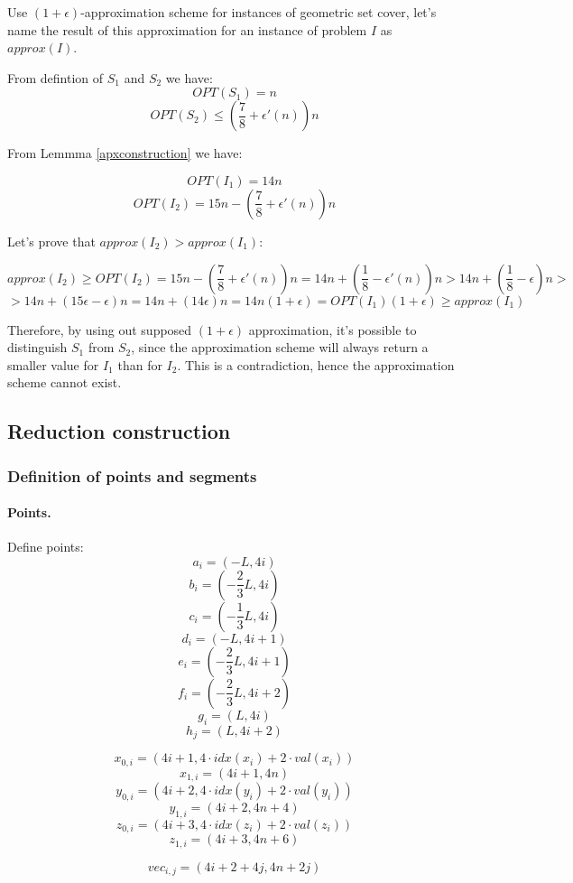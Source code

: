 Use $(1+\epsilon)$-approximation scheme for instances of geometric
set cover, let's name the result of this approximation
for an instance of problem $I$ as $approx(I)$.

From defintion of $S_1$ and $S_2$ we have:
$$OPT(S_1) = n$$
$$OPT(S_2) \le (\frac{7}{8} + \epsilon'(n))n$$

From Lemmma \ref{apxconstruction} we have:

$$OPT(I_1) = 14n$$
$$OPT(I_2) = 15n - (\frac{7}{8} + \epsilon'(n))n$$

Let's prove that $approx(I_2) > approx(I_1)$:

$$approx(I_2) \ge OPT(I_2) = 15n - (\frac{7}{8} + \epsilon'(n))n
	= 14n + (\frac{1}{8} - \epsilon'(n))n
	> 14n + (\frac{1}{8} - \epsilon)n > $$
$$	> 14n + (15\epsilon - \epsilon)n
	= 14n + (14\epsilon)n
	= 14n(1+\epsilon)
	= OPT(I_1)(1+\epsilon) \ge approx(I_1)$$ 



Therefore, by using out supposed $(1+\epsilon)$ approximation,
it’s possible to distinguish $S_1$ from $S_2$, since
the approximation scheme will always return a smaller value
for $I_1$ than for $I_2$. This is a contradiction,
hence the approximation scheme cannot exist.

\subsection{Reduction construction}
\subsubsection{Definition of points and segments}

\paragraph{Points.}

Define points:
	$$a_{i} = (-L, 4i)$$
	$$b_{i} = (-\frac{2}{3}L, 4i)$$
	$$c_{i} = (-\frac{1}{3}L, 4i)$$
	$$d_{i} = (-L, 4i+1)$$
	$$e_{i} = (-\frac{2}{3}L, 4i+1)$$
	$$f_{i} = (-\frac{2}{3}L, 4i+2)$$
	$$g_i = (L, 4i)$$
	$$h_j = (L, 4i+2)$$
	
	$$x_{0, i} = (4i+1, 4\cdot idx(x_i) + 2\cdot val(x_i))$$
	$$x_{1, i} = (4i+1, 4n)$$
	$$y_{0, i} = (4i+2, 4\cdot idx(y_i) + 2\cdot val(y_i))$$
	$$y_{1, i} = (4i+2, 4n + 4)$$	
	$$z_{0, i} = (4i+3, 4\cdot idx(z_i) + 2\cdot val(z_i))$$
	$$z_{1, i} = (4i+3, 4n + 6)$$
	
	$$vec_{i, j} = (4i + 2 + 4j, 4n + 2j)$$
	
